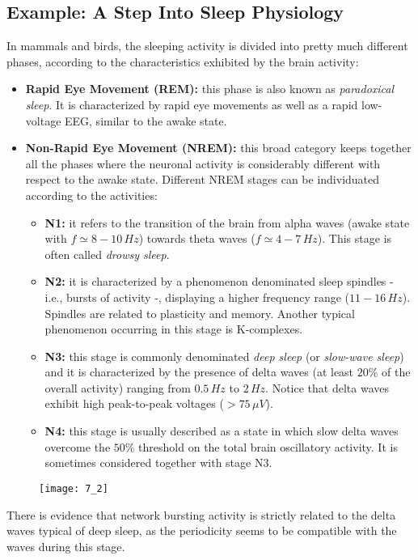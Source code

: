 \subsection{Example: A Step Into Sleep Physiology}
In mammals and birds, the sleeping activity is divided into pretty much different
phases, according to the characteristics exhibited by the brain activity:
\begin{itemize}
    \item \textbf{Rapid Eye Movement (REM):} this phase is also known as
          \textit{paradoxical sleep}. It is characterized by rapid eye movements
          as well as a rapid low-voltage EEG, similar to the awake state.
    \item \textbf{Non-Rapid Eye Movement (NREM):} this broad category keeps together
          all the phases where the neuronal activity is considerably different with
          respect to the awake state. Different NREM stages can be individuated
          according to the activities:
          \begin{itemize}
              \item \textbf{N1:} it refers to the transition of the brain from alpha
                    waves (awake state with \(f\simeq8-10\,Hz\)) towards theta waves
                    (\(f\simeq4-7\,Hz\)). This stage is often called \textit{drowsy sleep}.
              \item \textbf{N2:} it is characterized by a phenomenon denominated sleep
                    spindles - i.e., bursts of activity -, displaying a higher frequency
                    range (\(11-16\,Hz\)). Spindles are related to plasticity and
                    memory. Another typical phenomenon occurring in this stage is
                    K-complexes.
              \item \textbf{N3:} this stage is commonly denominated
                    \textit{deep sleep} (or \textit{slow-wave sleep}) and it is
                    characterized by the presence of delta waves (at least \(20\%\)
                    of the overall activity) ranging from \(0.5\,Hz\) to \(2\,Hz\).
                    Notice that delta waves exhibit high peak-to-peak voltages
                    (\(>75\,\mu{V}\)).
              \item \textbf{N4:} this stage is usually described as a state in which slow
                    delta waves overcome the \(50\%\) threshold on the total brain
                    oscillatory activity. It is sometimes considered together with stage N3.
          \end{itemize}
\end{itemize}
\begin{figure}[H]
    \texttt{[image: 7\_2]}
    \centering
\end{figure}
There is evidence that network bursting activity is strictly related to the delta waves
typical of deep sleep, as the periodicity seems to be compatible with the waves
during this stage.

